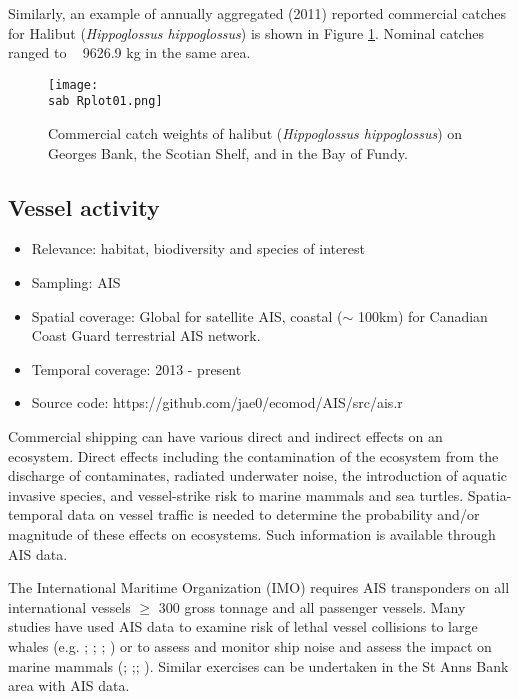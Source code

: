 \documentclass[letterpaper,portrait,11pt]{scrartcl}
\numberwithin{equation}{section}		%
\numberwithin{figure}{section}		%
\numberwithin{table}{section}				%
\newcommand{\ecomod}{\string~/ecomod_data/}   %
\newcommand{\sab}{\ecomod/mpa/sab/}   %
\begin{document}
Similarly, an example of annually aggregated (2011) reported commercial catches for Halibut (\textit{Hippoglossus hippoglossus}) is shown in Figure \ref{fig:halibut}.  Nominal catches ranged to ~ 9626.9 kg in the same area.



\begin{figure}[h]
	\centering
	\texttt{[image: \\sab Rplot01.png]}
	\caption{Commercial catch weights of halibut (\textit{Hippoglossus hippoglossus}) on Georges Bank, the Scotian Shelf, and in the Bay of Fundy.}
	\label{fig:halibut}
\end{figure}



\clearpage

\subsection{Vessel activity}

\begin{itemize}
	\item Relevance:  habitat, biodiversity and species of interest
	\item Sampling:  AIS
	\item Spatial coverage: Global for satellite AIS, coastal ($\sim$ 100km) for Canadian Coast Guard terrestrial AIS network.
	\item Temporal coverage: 2013 - present
	\item Source code: https://github.com/jae0/ecomod/AIS/src/ais.r
\end{itemize}	


Commercial shipping can have various direct and indirect effects on an ecosystem. Direct effects including the contamination of the ecosystem from the discharge of contaminates, radiated underwater noise, the introduction of aquatic invasive species, and vessel-strike risk to marine mammals and sea turtles.  Spatia-temporal data on vessel traffic is needed to determine the probability and/or magnitude of these effects on ecosystems.  Such information is available through AIS data.  

The International Maritime Organization (IMO) requires AIS transponders on all international vessels $\geq$ 300 gross tonnage and all passenger vessels.  Many studies have used AIS data to examine risk of lethal vessel collisions to large whales (e.g. \cite{vanderlaan:2009:efficacy}; \cite{wiley:2011:modeling}; \cite{redfern2013assessing}; \cite{guzman2013potential}) or to assess and monitor ship noise and assess the impact on marine mammals (\cite{hatch2008characterizing}; \cite{mckenna2012underwater};\cite{hatch2012quantifying};  \cite{merchant2014monitoring}).    Similar exercises can be undertaken in the St Anns Bank area with AIS data.
\end{document}
